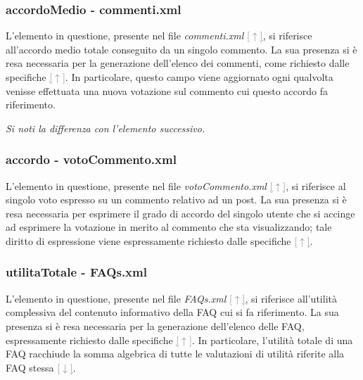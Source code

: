 \documentclass [a4paper,11pt]{book}
\begin{document}
\medskip

\subsubsection{accordoMedio - commenti.xml}

L'elemento in questione, presente nel file \emph{commenti.xml} \hyperref[sec:commenti]{\textcolor{gray}{[$\uparrow$]}}, si riferisce all'accordo medio totale conseguito da un singolo commento. La sua presenza si è resa necessaria per la generazione dell'elenco dei commenti, come richiesto dalle specifiche \hyperref[sec:specifiche]{\textcolor{gray}{[$\uparrow$]}}. In particolare, questo campo viene aggiornato ogni qualvolta venisse effettuata una nuova votazione sul commento cui questo accordo fa riferimento.

\medskip

\emph{Si noti la differenza con l'elemento successivo.}

\medskip

\subsubsection{accordo - votoCommento.xml}

L'elemento in questione, presente nel file \emph{votoCommento.xml} \hyperref[sec:votoCommento]{\textcolor{gray}{[$\uparrow$]}}, si riferisce al singolo voto espresso su un commento relativo ad un post. La sua presenza si è resa necessaria per esprimere il grado di accordo del singolo utente che si accinge ad esprimere la votazione in merito al commento che sta visualizzando; tale diritto di espressione viene espressamente richiesto dalle specifiche \hyperref[sec:specifiche]{\textcolor{gray}{[$\uparrow$]}}.

\medskip

\subsubsection{utilitaTotale - FAQs.xml}

L'elemento in questione, presente nel file \emph{FAQs.xml} \hyperref[sec:faqs]{\textcolor{gray}{[$\uparrow$]}}, si riferisce all'utilità complessiva del contenuto informativo della FAQ cui si fa riferimento. La sua presenza si è resa necessaria per la generazione dell'elenco delle FAQ, espressamente richiesto dalle specifiche \hyperref[sec:specifiche]{\textcolor{gray}{[$\uparrow$]}}. In particolare, l'utilità totale di una FAQ racchiude la somma algebrica di tutte le valutazioni di utilità riferite alla FAQ stessa \hyperref[sec:votofaq]{\textcolor{gray}{[$\downarrow$]}}.
\end{document}

